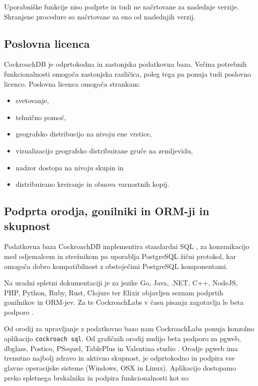 \documentclass[a4paper, 12pt]{book}
\begin{document}
Uporabniške funkcije niso podprte in tudi ne načrtovane za naslednje verzije. Shranjene procedure so načrtovane za eno od naslednjih verzij.

\subsection{Poslovna licenca}

CockroachDB je odprtokodna in zastonjska podatkovna baza. Večina potrebnih funkcionalnosti omogoča zastonjska različica, poleg tega pa ponuja tudi poslovno licenco. Poslovna licenca omogoča strankam:

\begin{itemize}
    \item svetovanje,
    \item tehnično pomoč,
    \item geografsko distribucijo na nivoju ene vrstice,
    \item vizualizacijo geografsko distribuirane gruče na zemljevidu,
    \item nadzor dostopa na nivoju skupin in
    \item distribuirano kreiranje in obnova varnostnih kopij.
\end{itemize}

\subsection{Podprta orodja, gonilniki in ORM-ji in skupnost}

Podatkovna baza CockroachDB implementira standardni SQL \cite{CRDB-sql-standard}, za komunikacijo med odjemalcem in strežnikom pa uporablja PostgreSQL žični protokol, kar omogoča dobro kompatibilnost z obstoječimi PostgreSQL komponentami.

Na uradni spletni dokumentaciji je za jezike Go, Java, .NET, C++, NodeJS, PHP, Python, Ruby, Rust, Clojure ter Elixir objavljen seznam podprtih gonilnikov in ORM-jev. Za te CockroachLabs v času pisanja zagotavlja le beta podporo \cite{CRDB-meta-drivers-orms}.

Od orodij za upravljanje z podatkovno bazo nam CockroachLabs ponuja konzolno aplikacijo \texttt{cockroach sql}. Od grafičnih orodij nudijo beta podporo za pgweb, dbglass, Postico, PSequel, TablePlus in Valentina studio \cite{CRDB-meta-vizualizers}. Orodje pgweb ima trenutno najbolj zdravo in aktivno skupnost, je odprtokodno in podpira vse glavne operacijske sisteme (Windows, OSX in Linux). Aplikacijo dostopamo preko spletnega brskalnika in podpira funkcionalnosti kot so:
\end{document}
